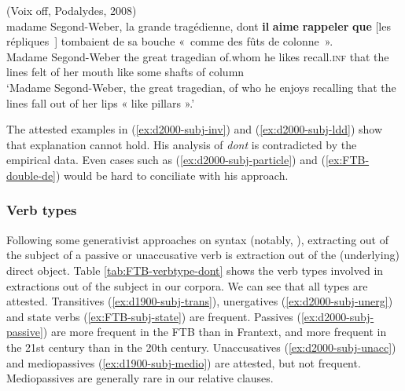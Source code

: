 \ea (Voix off, Podalydes, 2008)\\
\gll madame Segond-Weber, la grande tragédienne, dont \textbf{il} \textbf{aime} \textbf{rappeler} \textbf{que} [les répliques~\trace{}] tombaient de sa bouche «~comme des fûts de colonne~».\\
Madame Segond-Weber the great tragedian of.whom he likes recall\textsc{.inf} that the lines felt of her mouth like some shafts of column\\
\glt `Madame Segond-Weber, the great tragedian, of who he enjoys recalling that the lines fall out of her lips « like pillars ».'
\label{ex:d2000-subj-ldd}
\z 

The attested examples in (\ref{ex:d2000-subj-inv}) and (\ref{ex:d2000-subj-ldd}) show that  explanation cannot hold. His analysis of \emph{dont} is contradicted by the empirical data. Even cases such as (\ref{ex:d2000-subj-particle}) and (\ref{ex:FTB-double-de}) would be hard to conciliate with his approach. 

\subsubsection{Verb types}


Following some generativist approaches on syntax (notably, \citealp{Chomsky.2008}), extracting out of the subject of a passive or unaccusative verb is extraction out of the (underlying) direct object.
Table \ref{tab:FTB-verbtype-dont} shows the verb types involved in extractions out of the subject in our corpora. We can see that all types are attested. Transitives (\ref{ex:d1900-subj-trans}), unergatives (\ref{ex:d2000-subj-unerg}) and state verbs (\ref{ex:FTB-subj-state}) are frequent. Passives (\ref{ex:d2000-subj-passive}) are more frequent in the FTB than in Frantext, and more frequent in the 21st century than in the 20th century. Unaccusatives (\ref{ex:d2000-subj-unacc}) and mediopassives (\ref{ex:d1900-subj-medio}) are attested, but not frequent. Mediopassives are generally rare in our relative clauses. 

